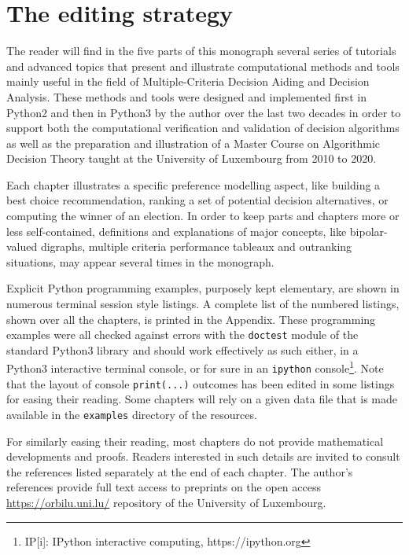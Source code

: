 \label{sec:0}

{}
\section*{The editing strategy}
\label{sec:0.1}

The reader will find in the five parts of this monograph several series of tutorials and advanced topics that present and illustrate computational methods and tools mainly useful in the field of Multiple-Criteria Decision Aiding and Decision Analysis. These methods and tools were designed and implemented first in Python2 and then in Python3 by the author over the last two decades in order to support both the computational verification and validation of decision algorithms as well as the preparation and illustration of a Master Course on Algorithmic Decision Theory taught at the University of Luxembourg from 2010 to 2020.

Each chapter illustrates a specific preference modelling aspect, like building a best choice recommendation, ranking a set of potential decision alternatives, or computing the winner of an election. In order to keep parts and chapters more or less self-contained, definitions and explanations of major concepts, like bipolar-valued digraphs, multiple criteria performance tableaux and outranking situations, may appear several times in the monograph.

Explicit Python programming examples, purposely kept elementary, are shown in numerous terminal session style listings. A complete list of the numbered listings, shown over all the chapters, is printed in the Appendix. These programming examples were all checked against errors with the \texttt{doctest} module of the standard Python3 library and should work effectively as such either, in a Python3 interactive terminal console, or for sure in an \texttt{ipython} console\footnote{IP[i]: IPython interactive computing, https://ipython.org}. Note that the layout of console \texttt{print(...)} outcomes has been edited in some listings for easing their reading. Some chapters will rely on a given data file that is made available in the \texttt{examples} directory of the \Digraph resources. 

For similarly easing their reading, most chapters do not provide mathematical developments and proofs. Readers interested in such details are invited to consult the references listed separately at the end of each chapter. The author's references provide full text access to preprints on the open access \href{https://orbilu.uni.lu/}{https://orbilu.uni.lu/} repository of the University of Luxembourg.

